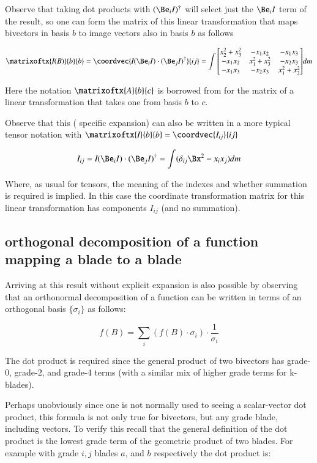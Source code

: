 Observe that taking dot products with $(\Be_i I)^\dagger$ will select just the $\Be_i I$ term of the result, so one can
form the matrix of this linear transformation that maps bivectors in basis $b$ to image vectors also in basis $b$ as follows

\[
\matrixoftx{\emph{I}(B)}{b}{b}
=
\coordvec{\emph{I}(\Be_i I) \cdot (\Be_j I)^\dagger}{ij}
=
\int {\begin{bmatrix}
x_2^2 + x_3^2  & - x_1 x_2  & - x_1 x_3 \\
-x_1 x_2  & x_1^2 + x_3^2  & - x_2 x_3  \\
-x_1 x_3  & -x_2 x_3  & x_1^2 + x_2^2  \\
\end{bmatrix}} dm
\]

Here the notation $\matrixoftx{A}{b}{c}$ is borrowed from
\cite{damiano1988cla} for the matrix of a linear transformation that
takes one from basis $b$ to $c$.

Observe that this ( specific expansion) can also be written in a more
typical tensor notation with $\matrixoftx{\emph{I}}{b}{b} = \coordvec{I_{ij}}{ij}$

\[
I_{ij} 
= \emph{I}(\Be_i I) \cdot (\Be_j I)^\dagger 
= \int (\delta_{ij} \Bx^2 - x_i x_j) dm
\]

Where, as usual for tensors, the meaning of the indexes and whether summation is required is implied.  In this case
the coordinate transformation matrix for this linear transformation has components $I_{ij}$ (and no summation).

\subsection{orthogonal decomposition of a function mapping a blade to a blade }

Arriving at this result without explicit expansion is also possible by observing that an orthonormal decomposition of a 
function can be written in terms of an orthogonal basis $\{\sigma_i\}$ as follows:

\begin{equation}
f(B) = \sum_i (f(B) \cdot \sigma_i) \cdot \frac{1}{\sigma_i}
\end{equation}\label{eqn:itensor:bladeOrthogDecomp}

The dot product is required since the general product of two bivectors has grade-0, grade-2, and grade-4 terms (with a similar mix of higher grade terms for k-blades).

Perhaps unobviously since one is not normally used to seeing a scalar-vector dot product, this formula is not only true for bivectors, but any grade blade, including
vectors.  To verify this recall that the 
general definition of the dot product is the lowest grade term of the geometric product of two blades.  For example with grade $i,j$ blades $a$, and $b$ respectively
the dot product is:

